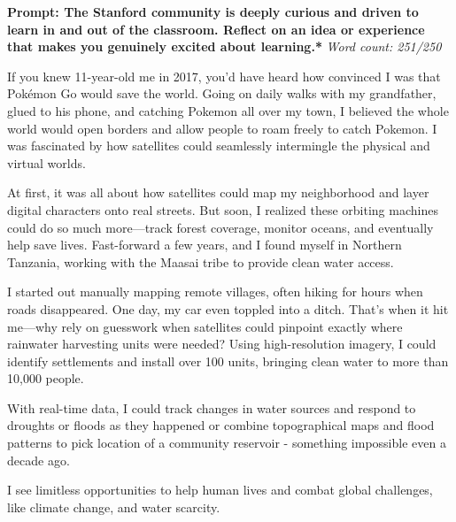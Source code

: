 \documentclass[10pt]{article}
\newcommand{\mybox}[3]{
    \begin{minipage}{\textwidth} %
        \begin{tcolorbox}[colback=grey, colframe=black, boxrule=0.5mm, width=\textwidth, sharp corners=south, enhanced]
            \textbf{#1} \textit{#2}
        \end{tcolorbox}
        \vspace{-16pt}
        \begin{tcolorbox}[colback=white, colframe=black, boxrule=0.5mm, width=\textwidth, sharp corners=north, top=0pt, enhanced]
            \vspace{1em}
            \setlength{\parskip}{1em}
            #3
        \end{tcolorbox}
    \end{minipage}
    \vspace{1em}
}
\begin{document}
\mybox{Prompt: The Stanford community is deeply curious and driven to learn in and out of the classroom. Reflect on an idea or experience that makes you genuinely excited about learning.*}{Word count: 251/250}{
If you knew 11-year-old me in 2017, you’d have heard how convinced I was that Pokémon Go would save the world. Going on daily walks with my grandfather, glued to his phone, and catching Pokemon all over my town, I believed the whole world would open borders and allow people to roam freely to catch Pokemon. I was fascinated by how satellites could seamlessly intermingle the physical and virtual worlds.

At first, it was all about how satellites could map my neighborhood and layer digital characters onto real streets. But soon, I realized these orbiting machines could do so much more—track forest coverage, monitor oceans, and eventually help save lives. Fast-forward a few years, and I found myself in Northern Tanzania, working with the Maasai tribe to provide clean water access.

I started out manually mapping remote villages, often hiking for hours when roads disappeared. One day, my car even toppled into a ditch. That’s when it hit me—why rely on guesswork when satellites could pinpoint exactly where rainwater harvesting units were needed? Using high-resolution imagery, I could identify settlements and install over 100 units, bringing clean water to more than 10,000 people.

With real-time data, I could track changes in water sources and respond to droughts or floods as they happened or combine topographical maps and flood patterns to pick location of a community reservoir - something impossible even a decade ago.

I see limitless opportunities to help human lives and combat global challenges, like climate change, and  water scarcity.
}
\end{document}
